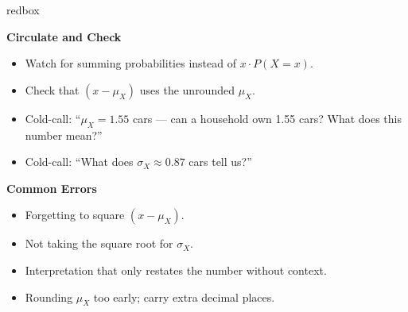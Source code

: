 \documentclass[10pt]{article}
\begin{document}
\begin{skillbox}{redbox}
\begin{minipage}[t]{0.48\linewidth}
    \textbf{Circulate and Check}
    \begin{itemize}
        \item Watch for summing probabilities instead of $x \cdot P(X=x)$.
        \item Check that $(x - \mu_X)$ uses the unrounded $\mu_X$.
        \item Cold-call: ``$\mu_X = 1.55$ cars --- can a household own 1.55 cars?
              What does this number mean?''
        \item Cold-call: ``What does $\sigma_X \approx 0.87$ cars tell us?''
    \end{itemize}
\end{minipage}
\hfill
\begin{minipage}[t]{0.48\linewidth}
    \textbf{Common Errors}
    \begin{itemize}
        \item Forgetting to square $(x - \mu_X)$.
        \item Not taking the square root for $\sigma_X$.
        \item Interpretation that only restates the number without context.
        \item Rounding $\mu_X$ too early; carry extra decimal places.
    \end{itemize}
\end{minipage}
\end{skillbox}
\end{document}
